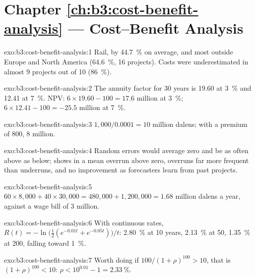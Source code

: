 \section*{Chapter \ref{ch:b3:cost-benefit-analysis} --- Cost--Benefit Analysis}

\begin{solution}{exo:b3:cost-benefit-analysis:1}
Rail, by 44.7~\% on average, and most outside Europe and North America (64.6~\%, 16
projects). Costs were underestimated in almost 9 projects out of 10 (86~\%).
\end{solution}

\begin{solution}{exo:b3:cost-benefit-analysis:2}
The annuity factor for 30 years is 19.60 at 3~\% and 12.41 at 7~\%. NPV: $6 \times 19.60 - 100 = 17.6$
million at 3~\%; $6 \times 12.41 - 100 = -25.5$ million at 7~\%.
\end{solution}

\begin{solution}{exo:b3:cost-benefit-analysis:3}
$1{,}000/0.0001 = 10$ million dalens; with a premium of 800, 8 million.
\end{solution}

\begin{solution}{exo:b3:cost-benefit-analysis:4}
Random errors would average zero and be as often above as below;  shows
in a mean overrun above zero, overruns far more frequent than underruns, and no
improvement as forecasters learn from past projects.
\end{solution}

\begin{solution}{exo:b3:cost-benefit-analysis:5}
$60 \times 8{,}000 + 40 \times 30{,}000 = 480{,}000 + 1{,}200{,}000 = 1.68$ million dalens a year, against a wage bill of 3
million.
\end{solution}

\begin{solution}{exo:b3:cost-benefit-analysis:6}
With continuous rates, $R(t) = -\ln\big(\tfrac12(e^{-0.01t} + e^{-0.05t})\big)/t$: 2.80~\% at 10 years, 2.13~\% at 50, 1.35~\% at 200,
falling toward 1~\%.
\end{solution}

\begin{solution}{exo:b3:cost-benefit-analysis:7}
Worth doing if $100/(1 + \rho)^{100} > 10$, that is $(1 + \rho)^{100} < 10$: $\rho < 10^{0.01} - 1 = 2.33~\%$.
\end{solution}

